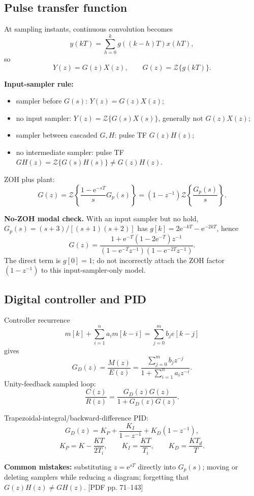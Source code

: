 \documentclass[10pt]{article}
\newcommand{\Z}{\mathcal{Z}}
\newcommand{\e}{\mathrm{e}}
\newcommand{\src}[1]{\hfill{\small\color{gray}[PDF pp. #1]}}
\newcommand{\weeklabel}[1]{\par\smallskip\noindent{\color{blue!60!black}\textbf{#1}}\par\smallskip}
\begin{document}
\subsection{Pulse transfer function}

\weeklabel{Week 3 begins}

At sampling instants, continuous convolution becomes
\[
y(kT)=\sum_{h=0}^{k}g((k-h)T)x(hT),
\]
so
\[
Y(z)=G(z)X(z),\qquad G(z)=\Z\{g(kT)\}.
\]

\textbf{Input-sampler rule:}
\begin{itemize}
  \item sampler before $G(s)$: $Y(z)=G(z)X(z)$;
  \item no input sampler: $Y(z)=\Z\{G(s)X(s)\}$, generally not $G(z)X(z)$;
  \item sampler between cascaded $G,H$: pulse TF $G(z)H(z)$;
  \item no intermediate sampler: pulse TF $GH(z)=\Z\{G(s)H(s)\}\ne G(z)H(z)$.
\end{itemize}

ZOH plus plant:
\[
G(z)=\Z\left\{\frac{1-\e^{-sT}}{s}G_p(s)\right\}
=(1-z^{-1})\Z\left\{\frac{G_p(s)}{s}\right\}.
\]

\textbf{No-ZOH modal check.}  With an input sampler but no hold, $G_p(s)=(s+3)/[(s+1)(s+2)]$ has $g[k]=2\e^{-kT}-\e^{-2kT}$, hence
\[
G(z)=\frac{1+\e^{-T}(1-2\e^{-T})z^{-1}}
{(1-\e^{-T}z^{-1})(1-\e^{-2T}z^{-1})}.
\]
The direct term is $g[0]=1$; do not incorrectly attach the ZOH factor $(1-z^{-1})$ to this input-sampler-only model.

\subsection{Digital controller and PID}

Controller recurrence
\[
m[k]+\sum_{i=1}^na_im[k-i]=\sum_{j=0}^mb_je[k-j]
\]
gives
\[
G_D(z)=\frac{M(z)}{E(z)}
=\frac{\sum_{j=0}^mb_jz^{-j}}{1+\sum_{i=1}^na_iz^{-i}}.
\]
Unity-feedback sampled loop:
\[
\frac{C(z)}{R(z)}=\frac{G_D(z)G(z)}{1+G_D(z)G(z)}.
\]

Trapezoidal-integral/backward-difference PID:
\[
G_D(z)=K_P+\frac{K_I}{1-z^{-1}}+K_D(1-z^{-1}),
\]
\[
K_P=K-\frac{KT}{2T_i},\qquad K_I=\frac{KT}{T_i},\qquad K_D=\frac{KT_d}{T}.
\]

\textbf{Common mistakes:} substituting $z=\e^{sT}$ directly into $G_p(s)$; moving or deleting samplers while reducing a diagram; forgetting that $G(z)H(z)\ne GH(z)$. \src{71--143}
\end{document}
